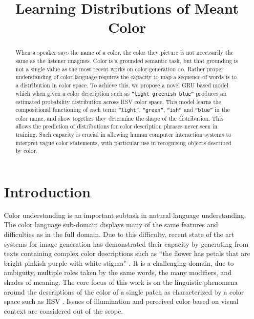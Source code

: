 \documentclass[11pt,letterpaper]{article}
\title{Learning Distributions of Meant Color}
\author{}
\date{}
\newcommand{\parencite}{\cite}
\begin{document}
\maketitle

\begin{abstract}
When a speaker says the name of a color, the color they picture is not necessarily the same as the listener imagines.
Color is a grounded semantic task, but that grounding is not a single value as the most recent works on color-generation do.
Rather proper understanding of color language requires the capacity to map a sequence of words is to a distribution in color space.
To achieve this, we propose a novel GRU based model which when given a color description such as \texttt{``light greenish blue''} produces an estimated probability distribution across HSV color space.
This model learns the compositional functioning of each term: \texttt{``light''}, \texttt{``green''}, \texttt{``ish''} and \texttt{``blue''} in the color name, and show together they determine the shape of the distribution.
This allows the prediction of  distributions for color description phrases never seen in training.
Such capacity is crucial in allowing human computer interaction systems to interpret vague color statements, with particular use in recognising objects described by color.
\end{abstract}

\section{Introduction}

Color understanding is an important subtask in natural language understanding.
The color language sub-domain displays many of the same features and difficulties as in the full domain.
Due to this difficulty, recent state of the art systems for image generation has demonstrated their capacity by generating from texts containing complex color descriptions such as ``the flower has petals that are bright pinkish purple with white stigma'' \parencite{reed2016generative, 2015arXiv151102793M}.
It is a challenging domain, due to ambiguity, multiple roles taken by the same words, the many modifiers, and shades of meaning.
The core focus of this work is on the linguistic phenomena around the descriptions of the color of a single patch as characterized by a color space such as HSV \parencite{smith1978color}.
Issues of illumination and perceived color based on visual context are considered out of the scope.
\end{document}
